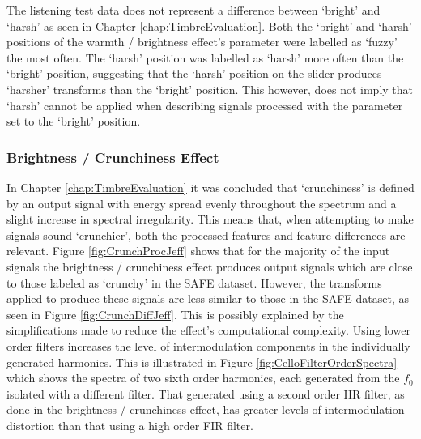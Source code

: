 			The listening test data does not represent a difference between `bright' and `harsh' as seen in
			Chapter \ref{chap:TimbreEvaluation}. Both the `bright' and `harsh' positions of the warmth /
			brightness effect's parameter were labelled as `fuzzy' the most often. The `harsh' position was
			labelled as `harsh' more often than the `bright' position, suggesting that the `harsh' position on
			the slider produces `harsher' transforms than the `bright' position. This however, does not imply
			that `harsh' cannot be applied when describing signals processed with the parameter set to the
			`bright' position.
			
		\subsubsection*{Brightness / Crunchiness Effect}
			In Chapter \ref{chap:TimbreEvaluation} it was concluded that `crunchiness' is defined by an output
			signal with energy spread evenly throughout the spectrum and a slight increase in spectral
			irregularity. This means that, when attempting to make signals sound `crunchier', both the
			processed features and feature differences are relevant.  Figure \ref{fig:CrunchProcJeff} shows
			that for the majority of the input signals the brightness / crunchiness effect produces output
			signals which are close to those labeled as `crunchy' in the SAFE dataset. However, the transforms
			applied to produce these signals are less similar to those in the SAFE dataset, as seen in Figure
			\ref{fig:CrunchDiffJeff}. This is possibly explained by the simplifications made to reduce the
			effect's computational complexity. Using lower order filters increases the level of intermodulation
			components in the individually generated harmonics. This is illustrated in Figure
			\ref{fig:CelloFilterOrderSpectra} which shows the spectra of two sixth order harmonics, each
			generated from the $f_{0}$ isolated with a different filter. That generated using a second order
			IIR filter, as done in the brightness / crunchiness effect, has greater levels of intermodulation
			distortion than that using a high order FIR filter. 
			
